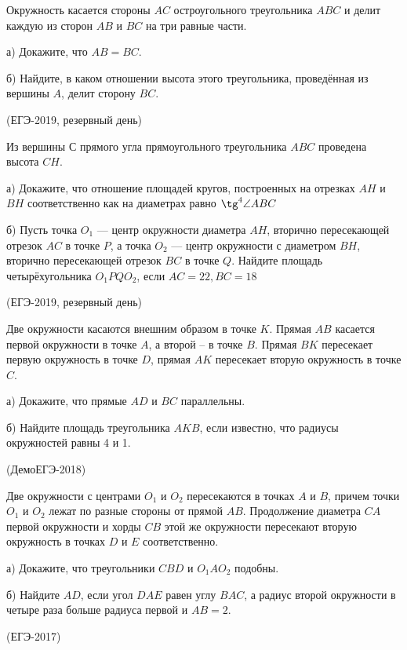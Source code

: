 \documentclass[c,12pt]{beamer}  %
\begin{document}
	\begin{frame}
		\begin{block}{}
			Окружность касается стороны $ AC $ остроугольного треугольника $ ABC $ и делит каждую из сторон $ AB $ и $ BC $ на три равные части.
			
			а) Докажите, что $ AB=BC $.
			
			б) Найдите, в каком отношении высота этого треугольника, проведённая из вершины $ A $, делит сторону $ BC $.
			
			(ЕГЭ-2019, резервный день)
		\end{block}
	\end{frame}

	\begin{frame}
		\begin{block}{}
			Из вершины $ С $ прямого угла прямоугольного треугольника $ ABC $ проведена высота $ CH $.
			
			а) Докажите, что отношение площадей кругов, построенных на отрезках $ AH $ и $ BH $ соответственно как на диаметрах равно $ \tg^4 \angle ABC $
			
			б) Пусть точка $ O_1 $ — центр окружности диаметра $ AH $, вторично пересекающей отрезок $ AC $ в точке $ P $, а точка $ O_2 $ — центр окружности с диаметром $ BH $, вторично пересекающей отрезок $ BC $ в точке $ Q $. Найдите площадь четырёхугольника $ O_1PQO_2 $, если $ AC=22, BC=18 $
			
			(ЕГЭ-2019, резервный день)
		\end{block}
	\end{frame}
	\begin{frame}
		\begin{block}{}
			Две окружности касаются внешним образом в точке $K$. Прямая
		 $AB$ касается первой окружности в точке $A$, а второй – в точке $B$.
			Прямая $BK$ пересекает первую окружность в точке $D$, прямая
		 $AK$ пересекает вторую окружность в точке $C$.
			
			а) Докажите, что прямые $AD$ и $BC$ параллельны.
			
			б) Найдите площадь треугольника $AKB$, если известно, что
			радиусы окружностей равны 4 и 1.
			
			(ДемоЕГЭ-2018)
		\end{block}
	\end{frame}
	

	\begin{frame}
		\begin{block}{}
			Две окружности с центрами $O_1$ и $O_2$ пересекаются в точках $A$ и
		 $B$, причем точки $O_1$ и $O_2$ лежат по разные стороны от прямой
		 $AB$. Продолжение диаметра $CA$ первой окружности и хорды $CB$
			этой же окружности пересекают вторую окружность в точках $D$ и
		 $E$ соответственно.
			
			а) Докажите, что треугольники $CBD$ и $O_1 A O_2$ подобны.
			
			б) Найдите $AD$, если угол $DAE$ равен углу $BAC$, а радиус второй
			окружности в четыре раза больше радиуса первой и $AB = 2$.
			
			(ЕГЭ-2017)
		\end{block}
	\end{frame}
\end{document}
